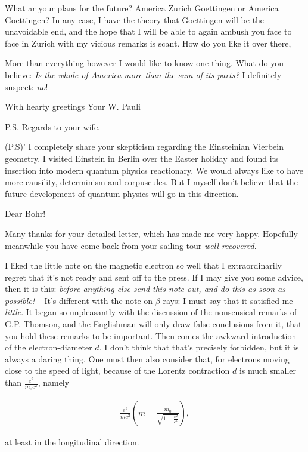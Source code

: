 \documentclass{article}
\newcommand{\uequ}[1]{
\begin{align*}
#1
\end{align*}
}
\begin{document}
What ar your plans for the future? America \to Zurich \to Goettingen or America \to Goettingen? In any case, I have the theory that Goettingen will be the unavoidable end, and the hope that I will be able to again ambush you face to face in Zurich with my vicious remarks is scant. How do you like it over there, 

More than everything however I would like to know one thing. What do you believe: \textit{Is the whole of America more than the sum of its parts?} I definitely suspect: \textit{no}!

With hearty greetings
Your W. Pauli

P.S. Regards to your wife. 

(P.S)' I completely share your skepticism regarding the Einsteinian Vierbein geometry. I visited Einstein in Berlin over the Easter holiday and found its insertion into modern quantum physics reactionary. We would always like to have more causility, determinism and corpuscules. But I myself don't believe that the future development of quantum physics will go in this direction.

\date{July 17, 1929}

Dear Bohr!

Many thanks for your detailed letter, which has made me very happy. Hopefully meanwhile you have come back from your sailing tour \textit{well-recovered}.

I liked the little note on the magnetic electron so well that I extraordinarily regret that it's not ready and sent off to the press. If I may give you some advice, then it is this: \textit{before anything else send this note out, and do this as soon as possible!} -- It's different with the note on $\beta$-rays: I must say that it satisfied me \textit{little}. It began so unpleasantly with the discussion of the nonsensical remarks of G.P. Thomson, and the Englishman will only draw false conclusions from it, that you hold these remarks to be important. Then comes the awkward introduction of the electron-diameter $d$. I don't think that that's precisely forbidden, but it is always a daring thing. One must then also consider that, for electrons moving close to the speed of light, because of the Lorentz contraction $d$ is much smaller than $\frac{e^2}{m_0 c^2}$, namely
\uequ{
\frac{e^2}{mc^2}\left(m=\frac{m_0}{\sqrt{1-\frac{v^2}{c^2}}}\right),
}
at least in the longitudinal direction.
\end{document}
